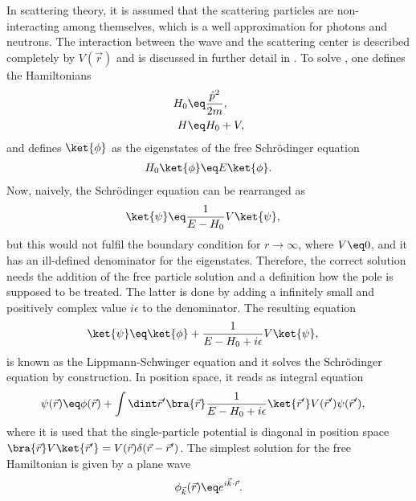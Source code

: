 \documentclass[\main/dresen_thesis.tex]{subfiles}
\begin{document}
In scattering theory, it is assumed that the scattering particles are non-interacting among themselves, which is a well approximation for photons and neutrons.
The interaction between the wave and the scattering center is described completely by $V(\vec{r})$ and is discussed in further detail in .
To solve , one defines the Hamiltonians
\begin{align}
  H_0 &\eq \frac{\hat{p}^2}{2m},\\
  H &\eq H_0 + V,
\end{align}
and defines $\ket{\phi}$ as the eigenstates of the free Schr\"odinger equation
\begin{align}
  H_0 \ket{\phi} &\eq E \ket{\phi}.\\
\end{align}
Now, naively, the Schr\"odinger equation can be rearranged as
\begin{align}
  \ket{\psi} &\eq \frac{1}{E - H_0} V \ket{\psi},
\end{align}
but this would not fulfil the boundary condition for $r \rightarrow \infty$, where $V\eq0$, and it has an ill-defined denominator for the eigenstates.
Therefore, the correct solution needs the addition of the free particle solution and a definition how the pole is supposed to be treated.
The latter is done by adding a infinitely small and positively complex value $i\epsilon$ to the denominator. The resulting equation
\begin{align}
  \ket{\psi} &\eq \ket{\phi} +  \frac{1}{E - H_0 + i \epsilon} V \ket{\psi},
\end{align}
is known as the Lippmann-Schwinger equation and  it solves the Schr\"odinger equation by construction.
In position space, it reads as integral equation
\begin{align}
  \psi (\vec{r}) &\eq \phi(\vec{r}) + \int \dint \vec{r}^\prime \bra{\vec{r}}\frac{1}{E - H_0 + i \epsilon} \ket{\vec{r}^\prime} V (\vec{r}^\prime)\psi (\vec{r}^\prime),
  \label{eq:theoreticalBackground:scattering:scatteringTheory:LippmanSchwingerIntegralEquation}
\end{align}
where it is used that the single-particle potential is diagonal in position space $\bra{\vec{r}} V \ket{\vec{r}^\prime} = V(\vec{r}) \delta(\vec{r} - \vec{r}^\prime)$.
The simplest solution for the free Hamiltonian is given by a plane wave
\begin{align}
  \phi_{\vec{k}}(\vec{r}) \eq e^{i\vec{k} \cdot \vec{r}}.
\end{align}
\end{document}
